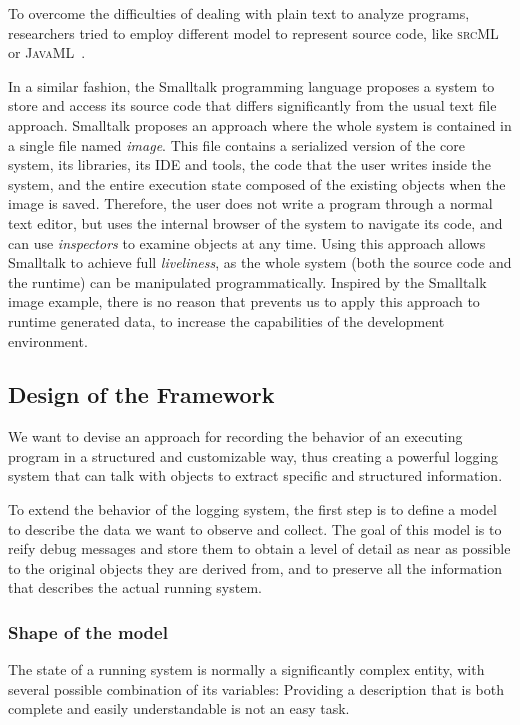 To overcome the difficulties of dealing with plain text to analyze programs, researchers tried to employ different model to represent source code, like \textsc{srcML}~\cite{Male2002a} or \textsc{JavaML}~\cite{Badr2000}.

In a similar fashion, the Smalltalk programming language proposes a system to store and access its source code that differs significantly from the usual text file approach.
Smalltalk proposes an approach where the whole system is contained in a single file named {\em image}.
This file contains a serialized version of the core system, its libraries, its IDE and tools, the code that the user writes inside the system, and the entire execution state composed of the existing objects when the image is saved.
Therefore, the user does not write a program through a normal text editor, but uses the internal browser of the system to navigate its code, and can use \emph{inspectors} to examine objects at any time.
Using this approach allows Smalltalk to achieve full \emph{liveliness}, as the whole system (both the source code and the runtime) can be manipulated programmatically.
Inspired by the Smalltalk image example, there is no reason that prevents us to apply this approach to runtime generated data, to increase the capabilities of the development environment.

\subsection{Design of the Framework}\label{sec:reified-design}

We want to devise an approach for recording the behavior of an executing program in a structured and customizable way, thus creating a powerful logging system that can talk with objects to extract specific and structured information.

To extend the behavior of the logging system, the first step is to define a model to describe the data we want to observe and collect.
The goal of this model is to reify debug messages and store them to obtain a level of detail as near as possible to the original objects they are derived from, and to preserve all the information that describes the actual running system.


\subsubsection{Shape of the model}

The state of a running system is normally a significantly complex entity, with several possible combination of its variables: Providing a description that is both complete and easily understandable is not an easy task.

